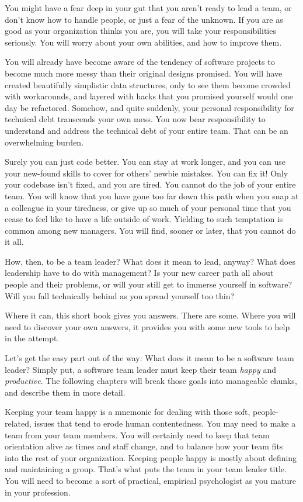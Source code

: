 You might have a fear deep in your gut that you aren't ready to lead a team, or don't know how to handle people, or just a fear of the unknown. If you are as good as your organization thinks you are, you will take your responsibilities seriously. You will worry about your own abilities, and how to improve them.

You will already have become aware of the tendency of software projects to become much more messy than their original designs promised. You will have created beautifully simplistic data structures, only to see them become crowded with workarounds, and layered with hacks that you promised yourself would one day be refactored. Somehow, and quite suddenly, your personal responsibility for technical debt transcends your own mess. You now bear responsibility to understand and address the technical debt of your entire team. That can be an overwhelming burden.

Surely you can just code better. You can stay at work longer, and you can use your new-found skills to cover for others' newbie mistakes. You can fix it! Only your codebase isn't fixed, and you are tired. You cannot do the job of your entire team. You will know that you have gone too far down this path when you snap at a colleague in your tiredness, or give up so much of your personal time that you cease to feel like to have a life outside of work. Yielding to such temptation is common among new managers. You will find, sooner or later, that you cannot do it all.

How, then, to be a team leader? What does it mean to lead, anyway? What does leadership have to do with management? Is your new career path all about people and their problems, or will your still get to immerse yourself in software? Will you fall technically behind as you spread yourself too thin?

Where it can, this short book gives you answers. There are some. Where you will need to discover your own answers, it provides you with some new tools to help in the attempt.

Let's get the easy part out of the way: What does it mean to be a software team leader? Simply put, a software team leader must keep their team \textit{happy} and \textit{productive}. The following chapters will break those goals into manageable chunks, and describe them in more detail.

Keeping your team happy is a mnemonic for dealing with those soft, people-related, issues that tend to erode human contentedness. You may need to make a team from your team members. You will certainly need to keep that team orientation alive as times and staff change, and to balance how your team fits into the rest of your organization. Keeping people happy is mostly about defining and maintaining a group. That's what puts the team in your team leader title. You will need to become a sort of practical, empirical psychologist as you mature in your profession.

